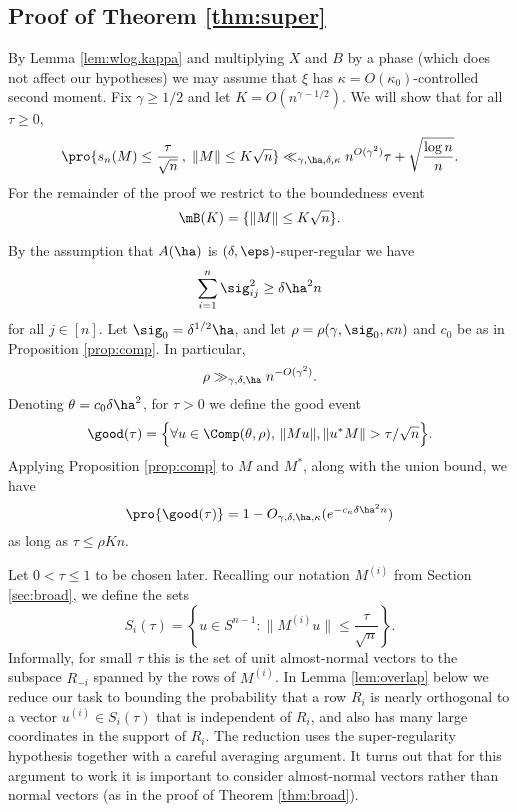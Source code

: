 \documentclass[aop,preprint]{imsart}
\theoremstyle{plain}
\theoremstyle{definition}
\theoremstyle{remark}
\numberwithin{equation}{section}
\numberwithin{theorem}{section}
\begin{document}
\subsection{Proof of Theorem \ref{thm:super}}	\label{sec:super}

By Lemma \ref{lem:wlog.kappa} and multiplying $X$ and $B$ by a phase (which does not affect our hypotheses) we may assume that $\xi$ has $\kappa=O(\kappa_0)$-controlled second moment.
Fix $\gamma\ge1/2$ and let $K=O(n^{\gamma-1/2})$. 
We will show that for all $\tau\ge 0$,
\begin{equation}	\label{bound:super2}
\pro{ s_n(M) \le \frac{\tau}{\sqrt{n}}\,, \; \|M\|\le K\sqrt{n}} \ll_{\gamma,\ha,\delta,\kappa} n^{O(\gamma^2)}\tau + \sqrt{\frac{\log n}{n}}.
\end{equation}
For the remainder of the proof we restrict to the boundedness event
\begin{equation}
\mB(K) = \{\|M\|\le K\sqrt{n}\}.
\end{equation}

By the assumption that $A(\ha)$ is $(\delta,\eps)$-super-regular we have
\[
\sum_{i=1}^n \sig_{ij}^2 \ge \delta \ha^2n
\]
for all $j\in [n]$. 
Let $\sig_0 = \delta^{1/2}\ha$, and let $\rho=\rho(\gamma,\sig_0,\kappa n)$ and $c_0$ be as in Proposition \ref{prop:comp}.
In particular,
\begin{equation}	\label{incomp:rholb}
\rho \gg_{\gamma,\delta,\ha}n^{-O(\gamma^2)}.
\end{equation}
Denoting $\theta=c_0\delta\ha^2$, for $\tau>0$ we define the good event
\begin{equation}
\good(\tau) = \Big\{ \forall u\in \Comp(\theta,\rho), \, \|Mu\|,\|u^*M\| > \tau/\sqrt{n}\Big\}.
\end{equation}
Applying Proposition \ref{prop:comp} to $M$ and $M^*$, along with the union bound, we have
\begin{equation}	\label{LB:goodtau}
\pro{\good(\tau)} = 1-O_{\gamma,\delta,\ha,\kappa}(e^{-c_\kappa\delta\ha^2n})
\end{equation}
as long as $\tau\le \rho K n$. 

Let $0<\tau\le 1$ to be chosen later.
Recalling our notation $M^{(i)}$ from Section \ref{sec:broad}, we define the sets
\begin{equation}
S_i(\tau) = \left\{ u\in S^{n-1}: \|M^{(i)}u\|\le \frac{\tau}{\sqrt{n}}\right\}.
\end{equation}
Informally, for small $\tau$ this is the set of unit almost-normal vectors to the subspace $R_{-i}$ spanned by the rows of $M^{(i)}$. 
In Lemma \ref{lem:overlap} below we reduce our task to bounding the probability that a row $R_i$ is nearly orthogonal to a vector $u^{(i)}\in S_i(\tau)$ that is independent of $R_i$, and also has many large coordinates in the support of $R_i$.
The reduction uses the super-regularity hypothesis together with a careful averaging argument.
It turns out that for this argument to work it is important to consider almost-normal vectors rather than normal vectors (as in the proof of Theorem \ref{thm:broad}).
%
\end{document}
